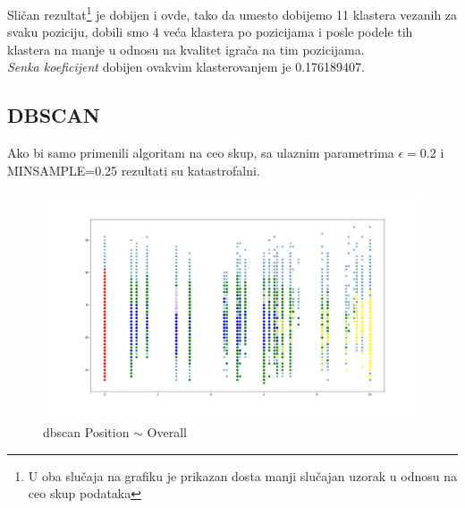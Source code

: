 \documentclass[a4paper, 11pt]{article}
\begin{document}
Sli\v{c}an rezultat\footnote{U oba slu\v{c}aja na grafiku je prikazan dosta manji slu\v{c}ajan
uzorak u odnosu na ceo skup podataka} je dobijen i ovde, tako da umesto dobijemo 11 klastera vezanih za svaku 
poziciju, dobili smo 4 ve\'{c}a klastera po pozicijama i posle podele tih klastera na manje
u odnosu na kvalitet igra\v{c}a na tim pozicijama.\\
\emph{Senka koeficijent} dobijen ovakvim klasterovanjem je 0.176189407.





\subsection{DBSCAN}
Ako bi samo primenili algoritam na ceo skup, sa ulaznim parametrima
$ \epsilon = 0.2 $ i MINSAMPLE=0.25 rezultati su katastrofalni.

\begin{figure}[h]
\centering
\graphicspath{{../}}
\includegraphics[scale=0.2]{dbscan_pca_020_25.png}
\caption{dbscan Position $\sim$ Overall}
\end{figure}
\end{document}
